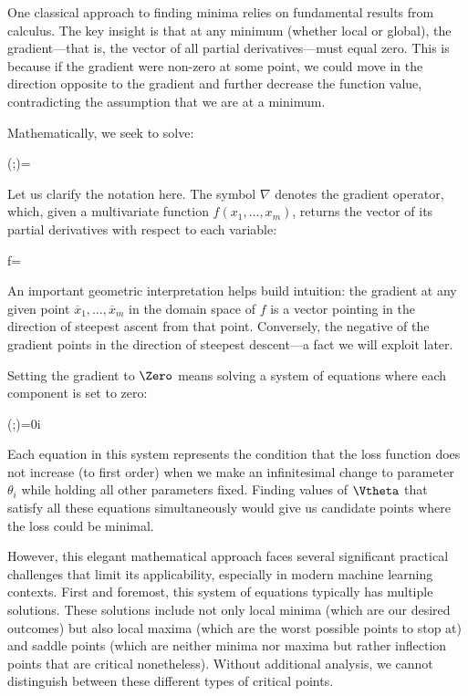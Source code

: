 \medskip

One classical approach to finding minima relies on fundamental results from calculus. The key insight is that at any minimum (whether local or global), the gradient—that is, the vector of all partial derivatives—must equal zero. This is because if the gradient were non-zero at some point, we could move in the direction opposite to the gradient and further decrease the function value, contradicting the assumption that we are at a minimum.

Mathematically, we seek to solve:
\begin{myequation}
\nabla{}(\Vtheta;)=\Zero
\end{myequation}

Let us clarify the notation here. The symbol $\nabla$ denotes the gradient operator, which, given a multivariate function $f(x_1,\ldots,x_m)$, returns the vector of its partial derivatives with respect to each variable:
\begin{myequation}
\nabla f=
\end{myequation}

An important geometric interpretation helps build intuition: the gradient at any given point $\overline{x}_1,\ldots,\overline{x}_m$ in the domain space of $f$ is a vector pointing in the direction of steepest ascent from that point. Conversely, the negative of the gradient points in the direction of steepest descent—a fact we will exploit later.

Setting the gradient to $\Zero$ means solving a system of equations where each component is set to zero:
\begin{myequation}
(\Vtheta;)=0\hspace{.5cm}\forall i
\end{myequation}

Each equation in this system represents the condition that the loss function does not increase (to first order) when we make an infinitesimal change to parameter $\theta_i$ while holding all other parameters fixed. Finding values of $\Vtheta$ that satisfy all these equations simultaneously would give us candidate points where the loss could be minimal.

\medskip

However, this elegant mathematical approach faces several significant practical challenges that limit its applicability, especially in modern machine learning contexts. First and foremost, this system of equations typically has multiple solutions. These solutions include not only local minima (which are our desired outcomes) but also local maxima (which are the worst possible points to stop at) and saddle points (which are neither minima nor maxima but rather inflection points that are critical nonetheless). Without additional analysis, we cannot distinguish between these different types of critical points.

